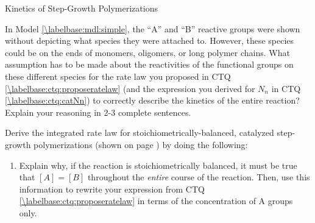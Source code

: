 \begin{activity}{Kinetics of Step-Growth Polymerizations}
\begin{ctqs}
\end{ctqs}
	

\begin{exercises}

		\exercise In Model \ref{\labelbase:mdl:simple}, the ``A'' and ``B'' reactive groups were shown without depicting what species they were attached to.  However, these species could be on the ends of monomers, oligomers, or long polymer chains. %
		What assumption has to be made about the reactivities of the functional groups on these different species for the rate law you proposed in CTQ \ref{\labelbase:ctq:proposeratelaw} (and the expression you derived for $N_n$ in CTQ \ref{\labelbase:ctq:catNn}) to correctly describe the kinetics of the entire reaction?  Explain your reasoning in 2-3 complete sentences.
		
			\begin{solution}\end{solution}
			
		\exercise Derive the integrated rate law for stoichiometrically-balanced, catalyzed step-growth polymerizations (shown on page \pageref{\labelbase:infobox:catintegrated}) by doing the following: \label{\labelbase:exc:catinteratelaw}
		
			\begin{enumerate}
				\item Explain why, if the reaction is stoichiometrically balanced, it must be true that $[A]=[B]$ throughout the \emph{entire} course of the reaction.  Then, use this information to rewrite your expression from CTQ \ref{\labelbase:ctq:proposeratelaw} in terms of the concentration of A groups only.
				
					\begin{solution}
\end{solution}
\end{enumerate}
\end{exercises}
\end{activity}

